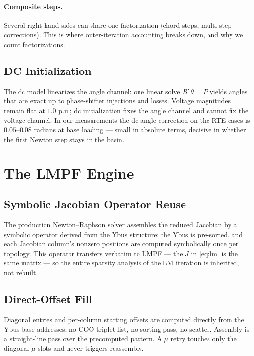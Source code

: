 \documentclass[11pt]{article}
\begin{document}
\paragraph{Composite steps.} Several right-hand sides can share one
factorization (chord steps, multi-step corrections). This is where
outer-iteration accounting breaks down, and why we count factorizations.

\subsection{DC Initialization}

The dc model linearizes the angle channel: one linear solve
$B'\,\theta = P$ yields angles that are exact up to phase-shifter
injections and losses. Voltage magnitudes remain flat at $1.0$ p.u.; dc
initialization fixes the angle channel and cannot fix the voltage channel.
In our measurements the dc angle correction on the RTE cases is
$0.05$--$0.08$ radians at base loading --- small in absolute terms, decisive
in whether the first Newton step stays in the basin.

\section{The LMPF Engine}

\subsection{Symbolic Jacobian Operator Reuse}

The production Newton--Raphson solver assembles the reduced Jacobian by a
symbolic operator derived from the Ybus structure: the Ybus is pre-sorted,
and each Jacobian column's nonzero positions are computed symbolically once
per topology. This operator transfers verbatim to LMPF --- the $J$ in
\eqref{eq:lm} is the same matrix --- so the entire sparsity analysis of the
LM iteration is inherited, not rebuilt.

\subsection{Direct-Offset Fill}

Diagonal entries and per-column starting offsets are computed directly from
the Ybus base addresses; no COO triplet list, no sorting pass, no scatter.
Assembly is a straight-line pass over the precomputed pattern. A $\mu$ retry
touches only the diagonal $\mu$ slots and never triggers reassembly.
\end{document}
